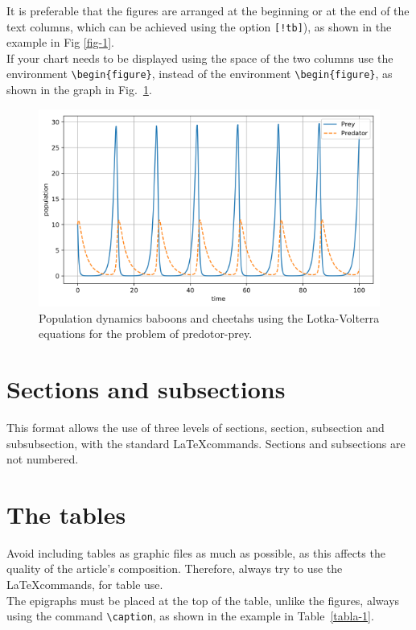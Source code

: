 \documentclass[eng]{MMSB-class-eng}
\begin{document}
It is preferable that the figures are arranged at the beginning or at the end of the text columns, which can be achieved using the option \texttt{[!tb]}), as shown in the example in Fig \ref{fig-1}.\\

If your chart needs to be displayed using the space of the two columns use the environment \verb!\begin{figure}!, instead of the environment \verb!\begin{figure}!, as shown in the graph in Fig.~\ref{fig-2}.

\begin{figure}[!tb] 
 \centering
 \includegraphics[width=12cm]{figura2} 
 \caption{Population dynamics baboons and cheetahs using the Lotka-Volterra equations for the problem of predotor-prey.} \label{fig-2}
\end{figure}

\section{Sections and subsections}
This format allows the use of three levels of sections, section, subsection and subsubsection, with the standard \LaTeX commands. Sections and subsections are not numbered.


\section{The tables}
Avoid including tables as graphic files as much as possible, as this affects the quality of the article's composition. Therefore, always try to use the \LaTeX commands, for table use.\\

The epigraphs must be placed at the top of the table, unlike the figures, always using the command \verb!\caption!, as shown in the example in Table~\ref{tabla-1}.\\
\end{document}
